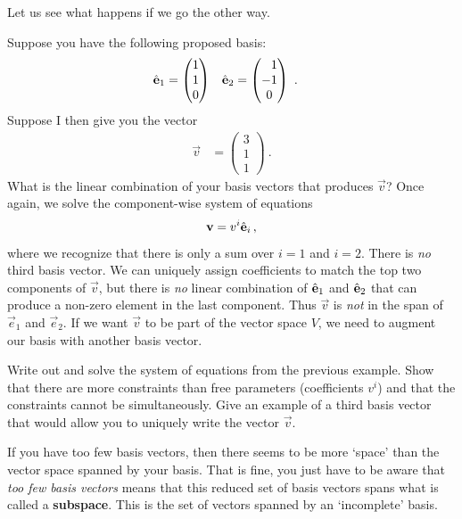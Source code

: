 \documentclass[12pt, oneside]{report}    %
\begin{document}
Let us see what happens if we go the other way. 
\begin{example}
Suppose you have the following proposed basis:
\begin{align}
    \bas{e}_1 &=
    \begin{pmatrix}
        1\\
        1\\
        0
    \end{pmatrix}
    &
    \bas{e}_2 &=
    \begin{pmatrix}
        \pp 1\\
        -1\\
        0
    \end{pmatrix}
    \ .
    \label{eq:eg:too:few:basis:vectors:basis}
\end{align}
Suppose I then give you the vector
\begin{align}
    \vec{v} &=
    \begin{pmatrix}
        3 \\ 1 \\ 1
    \end{pmatrix} \ .
\end{align}
What is the linear combination of your basis vectors that produces $\vec{v}$? Once again, we solve the component-wise system of equations 
\begin{align}
    \mathbf{v}= v^i \hat{\mathbf{e}}_i \, ,
\end{align}
where we recognize that there is only a sum over $i=1$ and $i=2$. There is \emph{no} third basis vector. We can uniquely assign coefficients to match the top two components of $\vec{v}$, but there is \emph{no} linear combination of $\hat{\mathbf{e}}_1$ and $\hat{\mathbf{e}}_2$ that can produce a non-zero element in the last component. Thus $\vec{v}$ is \emph{not} in the span of $\vec{e}_1$ and $\vec{e}_2$. If we want $\vec{v}$ to be part of the vector space $V$, we need to augment our basis with another basis vector.
\end{example} 
\begin{exercise}
Write out and solve the system of equations from the previous example. Show that there are more constraints than free parameters (coefficients $v^i$) and that the constraints cannot be simultaneously. Give an example of a third basis vector that would allow you to uniquely write the vector $\vec{v}$.
\end{exercise}

If you have too few basis vectors, then there seems to be more `space' than the vector space spanned by your basis. That is fine, you just have to be aware that \emph{too few basis vectors} means that this reduced set of basis vectors spans what is called a \textbf{subspace}. This is the set of vectors spanned by an `incomplete' basis.
\end{document}
